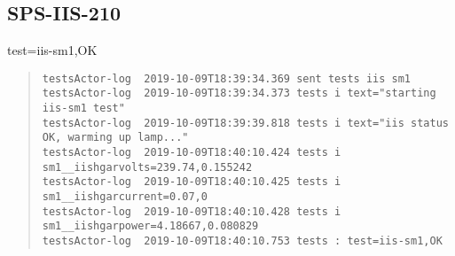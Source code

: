 \subsection{SPS-IIS-210}
\label{sec:tc-210}

test=iis-sm1,OK

\begin{quote}
\begin{tiny}
\begin{verbatim}
testsActor-log  2019-10-09T18:39:34.369 sent tests iis sm1
testsActor-log  2019-10-09T18:39:34.373 tests i text="starting iis-sm1 test"
testsActor-log  2019-10-09T18:39:39.818 tests i text="iis status OK, warming up lamp..."
testsActor-log  2019-10-09T18:40:10.424 tests i sm1__iishgarvolts=239.74,0.155242
testsActor-log  2019-10-09T18:40:10.425 tests i sm1__iishgarcurrent=0.07,0
testsActor-log  2019-10-09T18:40:10.428 tests i sm1__iishgarpower=4.18667,0.080829
testsActor-log  2019-10-09T18:40:10.753 tests : test=iis-sm1,OK
\end{verbatim}
\end{tiny}
\end{quote}
